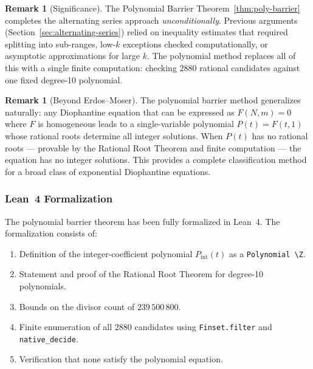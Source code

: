\documentclass[12pt,a4paper]{article}
\theoremstyle{plain}
\theoremstyle{definition}
\newtheorem{remark}[theorem]{Remark}
\begin{document}
\begin{remark}[Significance]
  The Polynomial Barrier Theorem~\ref{thm:poly-barrier} completes
  the alternating series approach \emph{unconditionally}.
  Previous arguments (Section~\ref{sec:alternating-series})
  relied on inequality estimates that required splitting into
  sub-ranges, low-$k$ exceptions checked computationally, or
  asymptotic approximations for large $k$.  The polynomial method
  replaces all of this with a single finite computation: checking
  $2880$ rational candidates against one fixed degree-10 polynomial.
\end{remark}

\begin{remark}[Beyond Erdos--Moser]
  The polynomial barrier method generalizes naturally: any
  Diophantine equation that can be expressed as
  $F(N,m) = 0$ where $F$ is homogeneous leads to a
  single-variable polynomial $P(t) = F(t,1)$ whose rational roots
  determine all integer solutions.  When $P(t)$ has no rational
  roots --- provable by the Rational Root Theorem and finite
  computation --- the equation has no integer solutions.
  This provides a complete classification method for a broad class
  of exponential Diophantine equations.
\end{remark}

\subsubsection{Lean~4 Formalization}
\label{sec:poly-lean}

The polynomial barrier theorem has been fully formalized in Lean~4.
The formalization consists of:
\begin{enumerate}
  \item Definition of the integer-coefficient polynomial
        $P_{\mathrm{int}}(t)$ as a \texttt{Polynomial \textbackslash Z}.
  \item Statement and proof of the Rational Root Theorem for
        degree-10 polynomials.
  \item Bounds on the divisor count of $239\,500\,800$.
  \item Finite enumeration of all $2880$ candidates using
        \texttt{Finset.filter} and \texttt{native\_decide}.
  \item Verification that none satisfy the polynomial equation.
\end{enumerate}
\end{document}

